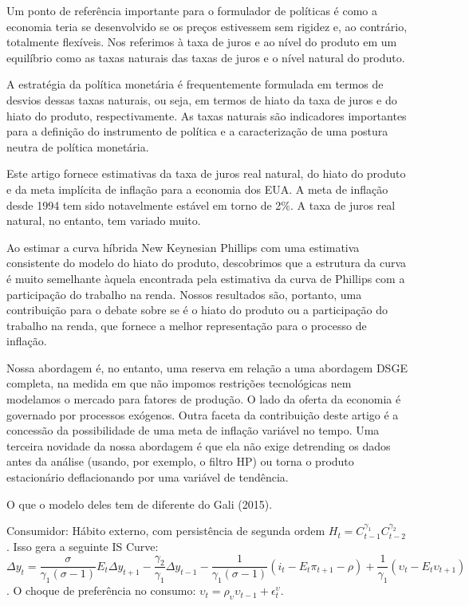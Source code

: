 Um ponto de referência importante para o formulador de políticas é como a economia teria se desenvolvido se os preços estivessem sem rigidez e, ao contrário, totalmente flexíveis. Nos referimos à taxa de juros e ao nível do produto em um equilíbrio como as taxas naturais das taxas de juros e o nível natural do produto.

A estratégia da política monetária é frequentemente formulada em termos de desvios dessas taxas naturais, ou seja, em termos de hiato da taxa de juros e do hiato do produto, respectivamente. As taxas naturais são indicadores importantes para a definição do instrumento de política e a caracterização de uma postura neutra de política monetária.

Este artigo fornece estimativas da taxa de juros real natural, do hiato do produto e da meta implícita de inflação para a economia dos EUA. A meta de inflação desde 1994 tem sido notavelmente estável em torno de 2$\%$. A taxa de juros real natural, no entanto, tem variado muito.

Ao estimar a curva híbrida New Keynesian Phillips com uma estimativa consistente do modelo do hiato do produto, descobrimos que a estrutura da curva é muito semelhante àquela encontrada pela estimativa da curva de Phillips com a participação do trabalho na renda. Nossos resultados são, portanto, uma contribuição para o debate sobre se é o hiato do produto ou a participação do trabalho na renda, que fornece a melhor representação para o processo de inflação.

Nossa abordagem é, no entanto, uma reserva em relação a uma abordagem DSGE completa, na medida em que não impomos restrições tecnológicas nem modelamos o mercado para fatores de produção. O lado da oferta da economia é governado por processos exógenos. Outra faceta da contribuição deste artigo é a concessão da possibilidade de uma meta de inflação variável no tempo. Uma terceira novidade da nossa abordagem é que ela não exige detrending os dados antes da análise (usando, por exemplo, o filtro HP) ou torna o produto estacionário deflacionando por uma variável de tendência.

O que o modelo deles tem de diferente do Gali (2015).

Consumidor: Hábito externo, com persistência de segunda ordem $H_t = C_{t-1}^{\gamma_1}C_{t-2}^{\gamma_2}$. Isso gera a seguinte IS Curve: $\Delta y_t = \dfrac{\sigma}{\gamma_1(\sigma -1 )}E_t \Delta y_{t+1} - \dfrac{\gamma_2}{\gamma_1}\Delta y_{t-1} - \dfrac{1}{\gamma_1 (\sigma -1)}(i_t - E_t \pi_{t+1} - \rho) + \dfrac{1}{\gamma_1}(\upsilon_t - E_t \upsilon_{t+1}) $. O choque de preferência no consumo: $\upsilon_t = \rho_{\upsilon}\upsilon_{t-1} + \epsilon_t^{\upsilon} $. \\

